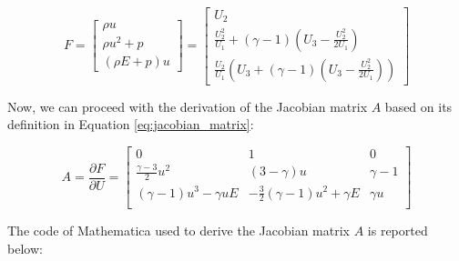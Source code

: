 \begin{equation}
    F = \begin{bmatrix}
        \rho u       \\
        \rho u^2 + p \\
        (\rho E + p) u
    \end{bmatrix} = \begin{bmatrix}
        U_2                                                                       \\
        \frac{U_2^2}{U_1} + (\gamma - 1) \left( U_3 - \frac{U_2^2}{2 U_1} \right) \\
        \frac{U_2}{U_1} \left( U_3 + (\gamma - 1) \left( U_3 - \frac{U_2^2}{2 U_1} \right) \right)
    \end{bmatrix}
\end{equation}

Now, we can proceed with the derivation of the Jacobian matrix $A$ based on its definition in Equation \ref{eq:jacobian_matrix}:

\begin{equation}
    A = \frac{\partial F}{\partial U} = \begin{bmatrix}
        0                             & 1                                        & 0          \\
        \frac{\gamma - 3}{2} u^2      & (3 - \gamma) u                           & \gamma - 1 \\
        (\gamma - 1) u^3 - \gamma u E & -\frac{3}{2} (\gamma - 1) u^2 + \gamma E & \gamma u   \\
    \end{bmatrix}
    \label{eq:matrix_A}
\end{equation}

The code of Mathematica used to derive the Jacobian matrix $A$ is reported below:



